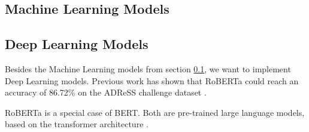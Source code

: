 \subsection{Machine Learning Models}\label{sec:models}

\subsection{Deep Learning Models}\label{sec:dl-models}
Besides the Machine Learning models from section \ref{sec:models}, we want to implement Deep Learning models. Previous work has shown that RoBERTa could reach an accuracy of 86.72\% on the ADReSS challenge dataset \cite{aslaksen2020diagnosis}. 

RoBERTa is a special case of BERT. Both are pre-trained large language models, based on the transformer architecture \cite{liu2019roberta, Devlin2019BERTPO}. 